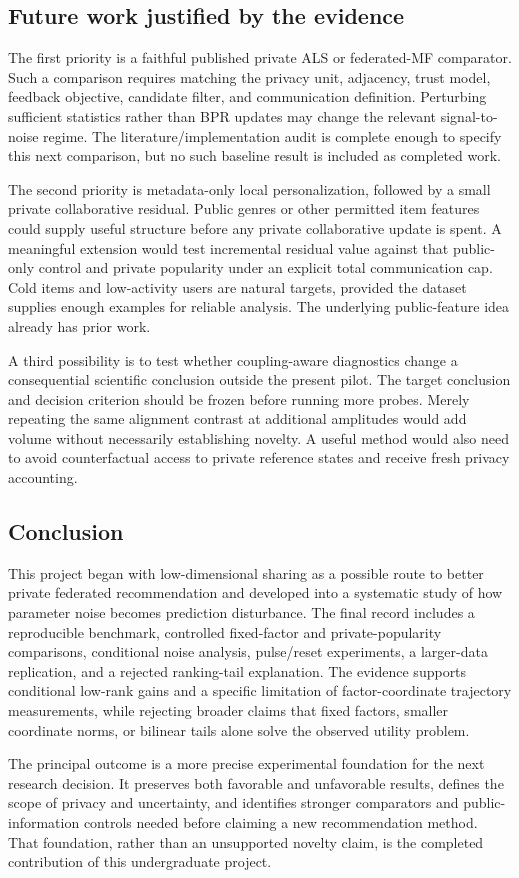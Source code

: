 \subsection{Future work justified by the evidence}
The first priority is a faithful published private ALS or federated-MF
comparator. Such a comparison requires matching the privacy unit, adjacency,
trust model, feedback objective, candidate filter, and communication
definition. Perturbing sufficient statistics rather than BPR updates may
change the relevant signal-to-noise regime. The literature/implementation
audit is complete enough to specify this next comparison, but no such
baseline result is included as completed work.

The second priority is metadata-only local personalization, followed by a
small private collaborative residual. Public genres or other permitted
item features could supply useful structure before any private collaborative
update is spent. A meaningful extension would test incremental residual
value against that public-only control and private popularity under an
explicit total communication cap. Cold items and low-activity users are
natural targets, provided the dataset supplies enough examples for reliable
analysis. The underlying public-feature idea already has prior work.

A third possibility is to test whether coupling-aware diagnostics change
a consequential scientific conclusion outside the present pilot. The
target conclusion and decision criterion should be frozen before running
more probes. Merely repeating the same alignment contrast at additional
amplitudes would add volume without necessarily establishing novelty.
A useful method would also need to avoid counterfactual access to private
reference states and receive fresh privacy accounting.

\subsection{Conclusion}
This project began with low-dimensional sharing as a possible route to
better private federated recommendation and developed into a systematic
study of how parameter noise becomes prediction disturbance. The final
record includes a reproducible benchmark, controlled fixed-factor and
private-popularity comparisons, conditional noise analysis, pulse/reset
experiments, a larger-data replication, and a rejected ranking-tail
explanation. The evidence supports conditional low-rank gains and a
specific limitation of factor-coordinate trajectory measurements, while
rejecting broader claims that fixed factors, smaller coordinate norms,
or bilinear tails alone solve the observed utility problem.

The principal outcome is a more precise experimental foundation for the
next research decision. It preserves both favorable and unfavorable
results, defines the scope of privacy and uncertainty, and identifies
stronger comparators and public-information controls needed before claiming
a new recommendation method. That foundation, rather than an unsupported
novelty claim, is the completed contribution of this undergraduate project.
